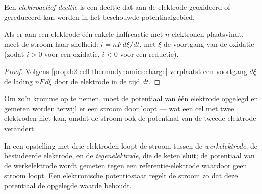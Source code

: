 \begin{definition}\label{def:b2:current-potential-curves:electroactive}
Een \emph{elektroactief deeltje} is een deeltje
dat aan de elektrode geoxideerd of gereduceerd kan worden in het beschouwde
potentiaalgebied.
\end{definition}

\begin{proposition}\label{prop:b2:current-potential-curves:current-rate}
Als er aan een elektrode één enkele halfreactie met $n$ elektronen plaatsvindt, meet de
stroom haar snelheid: $i = nF\,d\xi/dt$, met $\xi$ de voortgang van
de oxidatie (zodat $i > 0$ voor een oxidatie, $i < 0$ voor een reductie).
\end{proposition}

\begin{proof}
Volgens \cref{prop:b2:cell-thermodynamics:charge} verplaatst een voortgang $d\xi$ de
lading $nF\,d\xi$ door de elektrode in de tijd $dt$.
\end{proof}

Om zo'n kromme op te nemen, moet de potentiaal van één elektrode opgelegd en
gemeten worden terwijl er een stroom door loopt --- wat een cel met twee elektroden
niet kan, omdat de stroom ook de potentiaal van de tweede
elektrode verandert.

\begin{definition}\label{def:b2:current-potential-curves:set-up}
In een opstelling met drie elektroden loopt de stroom tussen de
\emph{werkelektrode}, de bestudeerde elektrode, en de \emph{tegenelektrode}, die de keten sluit; de potentiaal
van de werkelektrode wordt gemeten tegen een referentie-elektrode waardoor
geen stroom loopt. Een elektronische potentiostaat regelt de stroom zo
dat deze potentiaal de opgelegde waarde behoudt.
\end{definition}

